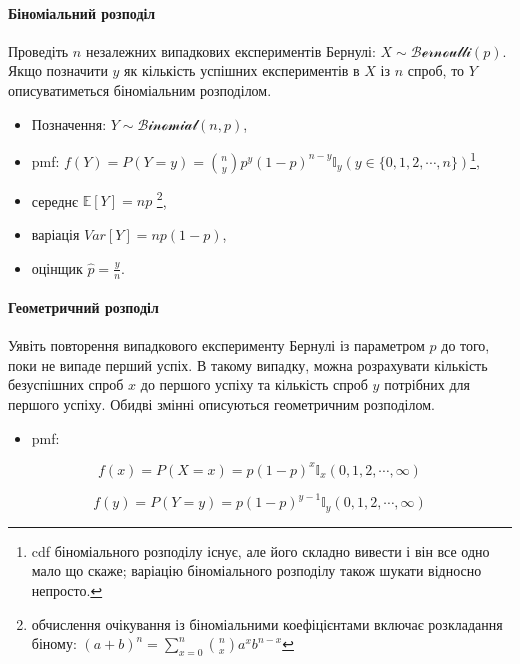 \documentclass[
  11pt,
]{book}
\providecommand{\tightlist}{%
  \setlength{\itemsep}{0pt}\setlength{\parskip}{0pt}}
\begin{document}
\paragraph{Біноміальний розподіл}\label{ux431ux456ux43dux43eux43cux456ux430ux43bux44cux43dux438ux439-ux440ux43eux437ux43fux43eux434ux456ux43b}

Проведіть \(n\) незалежних випадкових експериментів Бернулі: \(X \sim \mathcal{Bernoulli}(p)\). Якщо позначити \(y\) як кількість успішних експериментів в \(X\) із \(n\) спроб, то \(Y\) описуватиметься біноміальним розподілом.

\begin{itemize}
\item
  Позначення: \(Y \sim \mathcal{Binomial}(n, p)\),
\item
  pmf: \(f(Y) = P(Y = y) = \binom{n}{y} p^y (1-p)^{n - y} \mathbb{I}_y (y \in \{0, 1, 2, \cdots, n\})\)\footnote{cdf біноміального розподілу існує, але його складно вивести і він все одно мало що скаже; варіацію біноміального розподілу також шукати відносно непросто.},
\item
  середнє \(\mathbb{E} [Y] = np\) \footnote{обчислення очікування із біноміальними коефіцієнтами включає розкладання біному: \((a + b)^n = \sum \limits_{x = 0}^n \binom{n}{x} a^x b^{n - x}\)},
\item
  варіація \(Var[Y] = np(1-p)\),
\item
  оцінщик \(\hat{p} = \frac{y}{n}\).
\end{itemize}

\paragraph{Геометричний розподіл}\label{ux433ux435ux43eux43cux435ux442ux440ux438ux447ux43dux438ux439-ux440ux43eux437ux43fux43eux434ux456ux43b}

Уявіть повторення випадкового експерименту Бернулі із параметром \(p\) до того, поки не випаде перший успіх. В такому випадку, можна розрахувати кількість безуспішних спроб \(x\) до першого успіху та кількість спроб \(y\) потрібних для першого успіху. Обидві змінні описуються геометричним розподілом.

\begin{itemize}
\tightlist
\item
  pmf:
\end{itemize}

\[f(x) = P(X = x) = p(1 - p)^x \mathbb{I}_x (0, 1, 2, \cdots, \infty)\]

\[f(y) = P(Y = y) = p(1-p)^{y-1} \mathbb{I}_y (0, 1, 2, \cdots, \infty)\]
\end{document}
